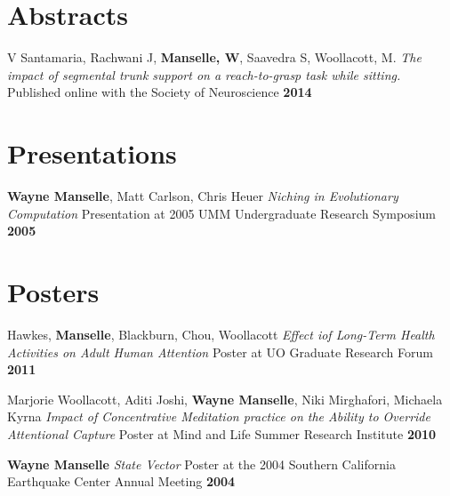 \documentclass[10pt]{article} %
\begin{document}
\begin{itemize-noindent}
\begin{itemize-noindent}

\section{Abstracts}

\job
{V Santamaria, Rachwani J, \textbf{Manselle, W}, Saavedra S, Woollacott, M.}
\textit{The impact of segmental trunk support on a reach-to-grasp task while sitting.}
{Published online with the Society of Neuroscience}
\textbf{2014}


\section{Presentations}

\job
{\textbf{Wayne Manselle}, Matt Carlson, Chris Heuer}
\textit{Niching in Evolutionary Computation}
{Presentation at 2005 UMM Undergraduate Research Symposium}
\textbf{2005}


\section{Posters}

\job
{Hawkes, \textbf{Manselle}, Blackburn, Chou, Woollacott}
\textit{Effect iof Long-Term Health Activities on Adult Human Attention}
{Poster at UO Graduate Research Forum}
\textbf{2011}

\job
{Marjorie Woollacott, Aditi Joshi, \textbf{Wayne Manselle}, Niki Mirghafori, Michaela Kyrna}
\textit{Impact of Concentrative Meditation practice on the Ability to Override Attentional Capture}
{Poster at Mind and Life Summer Research Institute}
\textbf{2010}

\job
{\textbf{Wayne Manselle}}
\textit{State Vector}
{Poster at the 2004 Southern California Earthquake Center Annual Meeting}
\textbf{2004}


\end{itemize-noindent}
\end{itemize-noindent}
\end{document}
